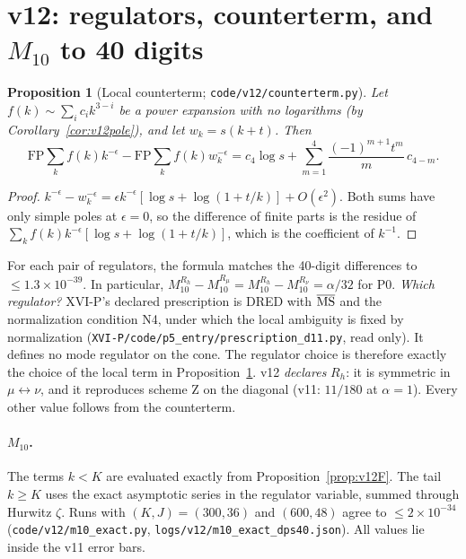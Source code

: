 \documentclass[11pt,a4paper]{article}
\newcommand{\loc}[1]{\nolinkurl{#1}}
\theoremstyle{plain}
\newtheorem{proposition}[theorem]{Proposition}
\theoremstyle{definition}
\theoremstyle{remark}
\numberwithin{equation}{section}
\begin{document}
\section{v12: regulators, counterterm, and \texorpdfstring{\(M_{10}\)}{M10} to 40 digits}
\label{sec:v12reg}

\begin{proposition}[Local counterterm; \loc{code/v12/counterterm.py}]
\label{prop:v12ct}
Let \(f(k)\sim\sum_ic_ik^{3-i}\) be a power expansion with no
logarithms (by Corollary~\ref{cor:v12pole}), and let
\(w_k=s(k+t)\). Then
\[
\mathrm{FP}\sum_kf(k)k^{-\epsilon}-\mathrm{FP}\sum_kf(k)w_k^{-\epsilon}
=c_4\log s+\sum_{m=1}^{4}\frac{(-1)^{m+1}t^m}{m}\,c_{4-m}.
\]
\end{proposition}
\begin{proof}
\(k^{-\epsilon}-w_k^{-\epsilon}=\epsilon k^{-\epsilon}[\log
s+\log(1+t/k)]+O(\epsilon^2)\). Both sums have only simple poles at
\(\epsilon=0\), so the difference of finite parts is the residue of
\(\sum_kf(k)k^{-\epsilon}[\log s+\log(1+t/k)]\), which is the
coefficient of \(k^{-1}\).
\end{proof}
For each pair of regulators, the formula matches the 40-digit
differences to \(\le1.3\times10^{-39}\). In particular,
\(M_{10}^{R_h}-M_{10}^{R_\mu}=M_{10}^{R_h}-M_{10}^{R_\nu}=\alpha/32\)
for P0. \emph{Which regulator?} XVI-P's declared prescription is
DRED with \(\overline{\rm MS}\) and the normalization condition N4,
under which the local ambiguity is fixed by normalization
(\loc{XVI-P/code/p5_entry/prescription_d11.py}, read only). It
defines no mode regulator on the cone. The regulator choice is
therefore exactly the choice of the local term in
Proposition~\ref{prop:v12ct}. v12 \emph{declares} \(R_h\): it is
symmetric in \(\mu\leftrightarrow\nu\), and it reproduces scheme Z on
the diagonal (v11: \(11/180\) at \(\alpha=1\)). Every other value
follows from the counterterm.

\paragraph{\(M_{10}\).} The terms \(k<K\) are evaluated exactly from
Proposition~\ref{prop:v12F}. The tail \(k\ge K\) uses the exact
asymptotic series in the regulator variable, summed through Hurwitz
\(\zeta\). Runs with \((K,J)=(300,36)\) and \((600,48)\) agree to
\(\le2\times10^{-34}\) (\loc{code/v12/m10_exact.py},
\loc{logs/v12/m10_exact_dps40.json}). All values lie inside the
v11 error bars.
\end{document}
